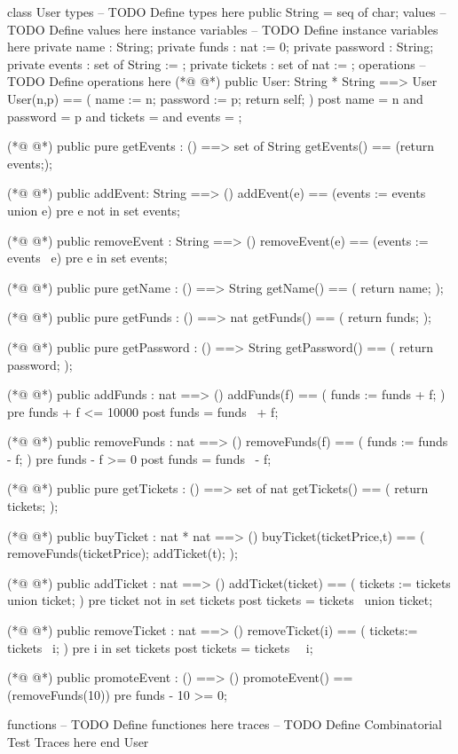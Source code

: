 \begin{vdmpp}[breaklines=true]
class User
types
-- TODO Define types here
  public String = seq of char;
values
-- TODO Define values here
instance variables
-- TODO Define instance variables here
 private name : String;
 private funds : nat := 0;
 private password : String;
 private events : set of String := {};
 private tickets : set of nat := {};
operations
-- TODO Define operations here
(*@
\label{User:16}
@*)
 public User: String * String ==> User
 User(n,p) == (
  name := n;
  password := p;
  return self;
 )
 post name = n and password = p and tickets = {} and events = {};
 
(*@
\label{getEvents:24}
@*)
 public pure getEvents : () ==> set of String
 getEvents() == (return events;);
 
(*@
\label{addEvent:27}
@*)
 public addEvent: String ==> ()
 addEvent(e) == (events := events union {e})
 pre e not in set events;
 
(*@
\label{removeEvent:31}
@*)
 public removeEvent : String ==> ()
 removeEvent(e) == (events := events \ {e})
 pre e in set events;
 
(*@
\label{getName:35}
@*)
 public pure getName : () ==> String
 getName() == (
  return name;
 );
 
(*@
\label{getFunds:40}
@*)
 public pure getFunds : () ==> nat
 getFunds() == (
  return funds;
 );
 
(*@
\label{getPassword:45}
@*)
 public pure getPassword : () ==> String
 getPassword() == (
  return password;
 );
 
(*@
\label{addFunds:50}
@*)
 public addFunds : nat ==> ()
 addFunds(f) == (
  funds := funds + f;
 )
 pre funds + f <= 10000
 post funds = funds~ + f;
 
(*@
\label{removeFunds:57}
@*)
 public removeFunds : nat ==> ()
 removeFunds(f) == (
  funds := funds - f;
 )
 pre funds - f >= 0
 post funds = funds~ - f;
 
(*@
\label{getTickets:64}
@*)
 public pure getTickets : () ==> set of nat
  getTickets() == (
  return tickets;
 );
 
(*@
\label{buyTicket:69}
@*)
 public buyTicket : nat * nat ==> ()
 buyTicket(ticketPrice,t) == (
  removeFunds(ticketPrice);
  addTicket(t);
 );
 
(*@
\label{addTicket:75}
@*)
 public addTicket : nat ==> ()
 addTicket(ticket) == (
  tickets := tickets union {ticket};
 )
 pre ticket not in set tickets
 post tickets = tickets~ union {ticket};
 
(*@
\label{removeTicket:82}
@*)
 public removeTicket : nat ==> ()
 removeTicket(i) == (
  tickets:= tickets \ {i}; 
 )
 pre i in set tickets
 post tickets = tickets~ \ {i}; 
 
 
(*@
\label{promoteEvent:90}
@*)
 public promoteEvent : () ==> ()
 promoteEvent() == (removeFunds(10))
 pre funds - 10 >= 0;
 
functions
-- TODO Define functiones here
traces
-- TODO Define Combinatorial Test Traces here
end User
\end{vdmpp}
